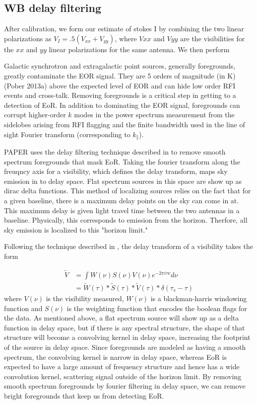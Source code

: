 \documentclass[twocolumn,numberedappendix]{emulateapj}
\begin{document}
\subsection{WB delay filtering}
After calibration, we form our estimate of stokes I by combining the two linear
polarizations as $V_{I} = .5 (V_{xx} + V_{yy})$, where $V{xx}$ and $V{yy}$ are
the visibilities for the $xx$ and $yy$ linear polarizations for the same
antenna. We then perform 


Galactic synchrotron and extragalactic point sources, generally foregrounds,
greatly contaminate the EOR signal. They are 5 orders of magnitude (in K)
(Pober 2013a) above the expected level of EOR and can hide low order RFI events
and cross-talk. Removing foregrounds is a critical step in getting to a
detection of EoR. In addition to dominating the EOR signal, foregrounds can
corrupt higher-order $k$ modes in the power spectrum measurement from the
sidelobes arising from RFI flagging and the finite bandwidth used in the line
of sight Fourier transform (corresponding to $k_{\parallel}$). 

PAPER uses the delay filtering technique described in \citep{parsons_et_al2012b} to
remove smooth spectrum foregrounds that mask EoR. Taking the fourier transform
along the freuqncy axis for a visibility, which defines the delay transform,
maps sky emission in to delay space. Flat spectrum sources in this space are
show up as dirac delta functions. This method of localizing sources relies on
the fact that for a given baseline, there is a maximum delay points on the sky
can come in at. This maximum delay is given light travel time between the two
antennas in a baseline. Physically, this corresponds to emission from the
horizon. Therfore, all sky emission is localized to this "horizon limit."

Following the technique described in \citep{parsons_et_al2012b}, the delay transform
of a visibility takes the form 

\begin{align}\label{eqn:delay_transform}
    \tilde{V} &= \int{W(\nu)S(\nu)V(\nu)e^{-2\pi{i}\tau\nu}d\nu} \\
              &= \tilde{W}(\tau) \ast \tilde{S}(\tau) \ast \tilde{V}(\tau) \ast
                 \delta(\tau_{s} - \tau)
\end{align}
where $V(\nu)$ is the visibility measured, $W(\nu)$ is a blackman-harris
windowing function and $S(\nu)$ is the weighting function that encodes the
boolean flags for the data. As mentioned above, a flat spectrum source will show
up as a delta function in delay space, but if there is any spectral structure,
the shape of that structure will become a convolving kernel in delay space,
increasing the footprint of the source in delay space. Since foregrounds are
modeled as having a smooth spectrum, the convolving kernel is narrow in delay
space, whereas EoR is expected to have a large amount of frequency structure
and hence has a wide convolution kernel, scattering signal outside of the
horizon limit. By removing smooth spectrum foregrounds by fourier filtering in
delay space, we can remove bright foregrounds that keep us from detecting EoR.
\end{document}
